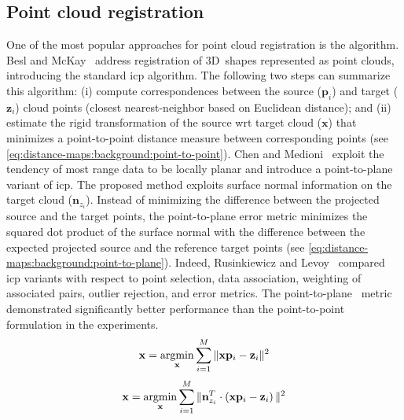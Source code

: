 \subsection{Point cloud registration}\label{sec:distance-maps:background:registration}
One of the most popular approaches for point cloud registration is
the  algorithm.
Besl and McKay~\cite{besl-mckay:tpami:1992} address registration of 3D~shapes
represented as point clouds, introducing the standard \gls{icp} algorithm.
The following two steps can summarize this algorithm:
(i) compute correspondences between the source ($\mathbf{p}_i$) and target ($\mathbf{z}_i$)
cloud points (closest nearest-neighbor based on Euclidean distance); and
(ii) estimate the rigid transformation of the source \gls{wrt} target cloud
($\mathbf{x}$) that minimizes a point-to-point distance measure between
corresponding points (see \eqref{eq:distance-maps:background:point-to-point}).
Chen and Medioni~\cite{chen-medioni:icra:1991} exploit the tendency of
most range data to be locally planar and introduce a point-to-plane variant
of \gls{icp}. The proposed method exploits surface normal information
on the target cloud ($\mathbf{n}_{z_i}$).
Instead of minimizing the difference between the projected source and
the target points, the point-to-plane error metric minimizes
the squared dot product of the surface normal with
the difference between the expected projected source and
the reference target points
(see \eqref{eq:distance-maps:background:point-to-plane}).
Indeed, Rusinkiewicz and Levoy~\cite{rusinkiewicz-levoy:im:2001} compared
\gls{icp} variants with respect to point selection,
data association, weighting of associated pairs, outlier rejection, and
error metrics. The point-to-plane~\cite{chen-medioni:icra:1991}
metric demonstrated significantly better performance than
the point-to-point~\cite{besl-mckay:tpami:1992} formulation in the experiments.
\begin{equation}\label{eq:distance-maps:background:point-to-point}
\mathbf{x} = \operatorname*{argmin}_\mathbf{x} \sum_{i=1}^M \| \mathbf{x} \mathbf{p}_i - \mathbf{z}_i \|^2
\end{equation}
\begin{equation}\label{eq:distance-maps:background:point-to-plane}
\mathbf{x} = \operatorname*{argmin}_\mathbf{x} \sum_{i=1}^M \| \mathbf{n}_{z_i}^T \cdot
\left( \mathbf{x} \mathbf{p}_i - \mathbf{z}_i \right) \|^2
\end{equation}


